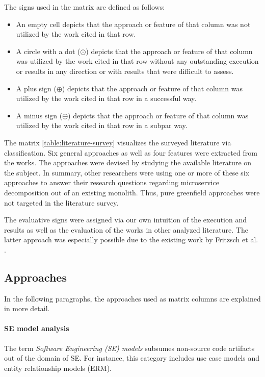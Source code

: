 \documentclass[12pt,a4paper]{report}
\begin{document}
\begin{table}[ht!]
{  The signs used in the matrix  are defined as follows:
  \begin{itemize}[noitemsep]
      \item An empty cell depicts that the approach or feature of that column was not utilized
      by the work cited in that row.
      \item A circle with a dot ($\odot$) depicts that the approach or feature
      of that column was utilized by the work cited in that row without any outstanding execution
      or results in any direction or with results that were difficult to assess.
      \item A plus sign ($\oplus$) depicts that the approach or feature
      of that column was utilized by the work cited in that row in a successful way.
      \item A minus sign ($\ominus$) depicts that the approach or feature
      of that column was utilized by the work cited in that row in a subpar way.
  \end{itemize}
}
\label{table:literature-survey}
\end{table}

The matrix \ref{table:literature-survey} visualizes the surveyed literature
via classification. Six general approaches as well as four features were
extracted from the works. The approaches were devised by studying the
available literature on the subject.
In summary, other researchers were using one or more of these six approaches
to answer their research questions regarding microservice decomposition
out of an existing monolith. Thus, pure greenfield approaches were
not targeted in the literature survey.

The evaluative signs were assigned via our own intuition of the execution
and results as well as the evaluation of the works in other analyzed literature.
The latter approach was especially possible due to
the existing work by Fritzsch et al. \cite{fritzsch2018monolith}.


\subsection*{Approaches}

In the following paragraphs, the approaches used as matrix columns are explained in more detail.
\paragraph{SE model analysis}
The term \textit{Software Engineering (SE) models} subsumes non\hyp source code
artifacts out of the domain of SE.
For instance, this category includes use case models and entity relationship models (ERM).
\end{document}
